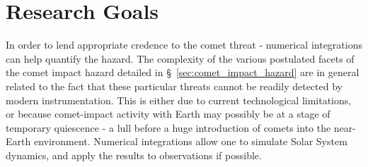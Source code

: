 







\section{Research Goals}

In order to lend appropriate credence to the comet threat - numerical integrations can help quantify the hazard. The complexity of the various postulated facets of the comet impact hazard detailed in \S~\ref{sec:comet_impact_hazard} are in general related to the fact that these particular threats cannot be readily detected by modern instrumentation. This is either due to current technological limitations, or because comet-impact activity with Earth may possibly be at a stage of temporary quiescence - a lull before a huge introduction of comets into the near-Earth environment. Numerical integrations allow one to simulate Solar System dynamics, and apply the results to observations if possible.%

